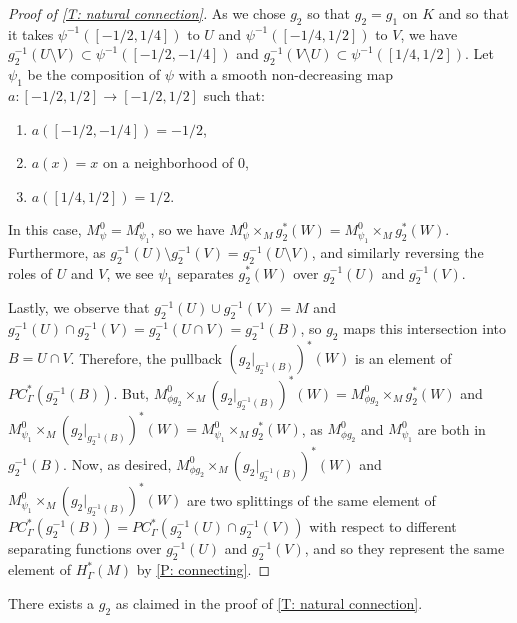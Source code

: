 \begin{proof}[Proof of \cref{T: natural connection}]
	As we chose $g_2$ so that $g_2 = g_1$ on $K$ and so that it takes $\psi^{-1}([-1/2,1/4])$ to $U$ and $\psi^{-1}([-1/4,1/2])$ to $V$, we have $g_2^{-1}(U \setminus V) \subset \psi^{-1}([-1/2,-1/4])$ and $g_2^{-1}(V \setminus U) \subset \psi^{-1}([1/4,1/2])$.
	Let $\psi_1$ be the composition of $\psi$ with a smooth non-decreasing map $a \colon [-1/2,1/2] \to [-1/2,1/2]$ such that:
	\begin{enumerate}
		\item $a([-1/2,-1/4]) = -1/2$,
		\item $a(x)=x$ on a neighborhood of $0$,
		\item $a([1/4,1/2]) = 1/2$.
	\end{enumerate}
	In this case, $M^0_\psi = M^0_{\psi_1}$, so we have $M^0_\psi \times_M g_2^*(W) = M^0_{\psi_1} \times_M g_2^*(W)$.
	Furthermore, as $g_2^{-1}(U) \setminus g_2^{-1}(V) = g_2^{-1}(U \setminus V)$, and similarly reversing the roles of $U$ and $V$, we see $\psi_1$ separates $g_2^*(W)$ over $g_2^{-1}(U)$ and $g_2^{-1}(V)$.

	Lastly, we observe that $g_2^{-1}(U) \cup g_2^{-1}(V) = M$ and $g_2^{-1}(U) \cap g_2^{-1}(V) = g_2^{-1} (U \cap V) = g_2^{-1}(B)$, so $g_2$ maps this intersection into $B = U \cap V$.
	Therefore, the pullback $(g_2|_{g_2^{-1} (B)})^* (W)$ is an element of $PC^*_\Gamma(g_2^{-1} (B))$.
	But, $M^0_{\phi g_2} \times_M	(g_2|_{g_2^{-1} (B)})^* (W) = M^0_{\phi g_2} \times_M g_2^*(W)$ and $M^0_{\psi_1} \times_M (g_2|_{g_2^{-1} (B)})^* (W) = M^0_{\psi_1} \times_M g_2^*(W)$, as $M^0_{\phi g_2}$ and $M^0_{\psi_1}$ are both in $g_2^{-1} (B)$.
	Now, as desired, $M^0_{\phi g_2} \times_M	(g_2|_{g_2^{-1} (B)})^* (W)$ and $M^0_{\psi_1} \times_M (g_2|_{g_2^{-1} (B)})^* (W)$ are two splittings of the same element of $PC^*_\Gamma(g_2^{-1} (B)) = PC^*_\Gamma(g_2^{-1}(U) \cap g_2^{-1}(V)) $ with respect to different separating functions over $g_2^{-1}(U)$ and $g_2^{-1}(V)$, and so they represent the same element of $H^*_\Gamma(M)$ by \cref{P: connecting}.
\end{proof}

\begin{lemma}
	There exists a $g_2$ as claimed in the proof of \cref{T: natural connection}.
\end{lemma}

